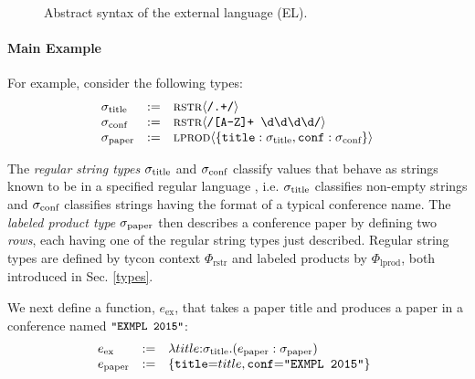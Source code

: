\begin{figure}[t]
\small
\hspace{-5px}
\caption{Abstract syntax of the external language (EL).}
\label{syntax-EL}
\end{figure}

\paragraph{Main Example} For example, consider the following types:
\[\begin{array}{lcl}
\sigma_\text{title} & := & {\textsc{rstr}}\langle\texttt{/.+/}\rangle\\
\sigma_\text{conf} & := & {\textsc{rstr}}\langle\texttt{/[A-Z]+ \textbackslash d\textbackslash d\textbackslash d\textbackslash d/}\rangle\\
\sigma_\text{paper} & := & {\textsc{lprod}}\langle\{\texttt{title} : \sigma_\text{title}, \texttt{conf} : \sigma_\text{conf}\}\rangle\end{array}\]

The \emph{regular string types} $\sigma_\text{title}$ and $\sigma_\text{conf}$ classify values that behave as strings known to be in a specified regular language \cite{sanitation-psp14}, i.e. $\sigma_\text{title}$ classifies {non-empty strings} and $\sigma_\text{conf}$ classifies strings having the format of a typical conference name. The \emph{labeled product type} $\sigma_\text{paper}$ then describes a conference paper by defining two \emph{rows}, each having one of the regular string types just described. Regular string types are defined by  tycon context $\Phi_\text{rstr}$ and labeled products by $\Phi_\text{lprod}$, both introduced in Sec. \ref{types}.%

We next define a function, $e_\text{ex}$, that takes a paper title and produces a paper in a conference named $\small\texttt{"EXMPL 2015"}$: %
\[\hspace{-5px}\begin{array}{lcl}
e_\text{ex} & := & \elam{\stx{title}}{title}{(e_\text{paper} : \stx{paper})}\\
e_\text{paper} & := & \{\conclbl{title}{=}title, \conclbl{conf}{=}\texttt{"EXMPL 2015"}\}
\end{array}\]


